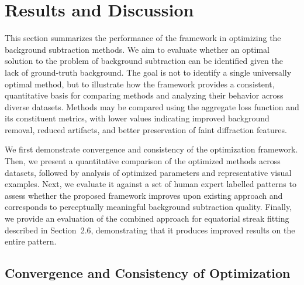 \documentclass[iucr]{iucrjournals}
\begin{document}
\section{Results and Discussion}

This section summarizes the performance of the framework in optimizing the background subtraction methods. We aim to evaluate whether an optimal solution to the problem of background subtraction can be identified given the lack of ground-truth background. The goal is not to identify a single universally optimal method, but to illustrate how the framework provides a consistent, quantitative basis for comparing methods and analyzing their behavior across diverse datasets. Methods may be compared using the aggregate loss function and its constituent metrics, with lower values indicating improved background removal, reduced artifacts, and better preservation of faint diffraction features.

We first demonstrate convergence and consistency of the optimization framework. Then, we present a quantitative comparison of the optimized methods across datasets, followed by analysis of optimized parameters and representative visual examples. Next, we evaluate it against a set of human expert labelled patterns to assess whether the proposed framework improves upon existing approach and corresponds to perceptually meaningful background subtraction quality. Finally, we provide an evaluation of the combined approach for equatorial streak fitting described in Section~2.6, demonstrating that it produces improved results on the entire pattern. 


\subsection{Convergence and Consistency of Optimization}
\end{document}

